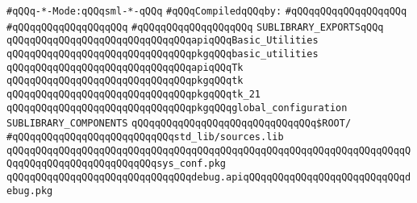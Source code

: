 \label{src/lib/tk/src/tk.sublib}
\verb|#qQQq-*-Mode:qQQqsml-*-qQQq|\newline
\newline
\verb|#qQQqCompiledqQQqby:|\newline
\verb|#qQQqqQQqqQQqqQQqqQQq|\newline
\verb|#qQQqqQQqqQQqqQQqqQQq|\newline
\verb|#qQQqqQQqqQQqqQQqqQQq|\newline
\newline
\verb|SUBLIBRARY_EXPORTSqQQq|\newline
\newline
\newline
\verb|qQQqqQQqqQQqqQQqqQQqqQQqqQQqqQQqapiqQQqBasic_Utilities|\newline
\verb|qQQqqQQqqQQqqQQqqQQqqQQqqQQqqQQqpkgqQQqbasic_utilities|\newline
\newline
\verb|qQQqqQQqqQQqqQQqqQQqqQQqqQQqqQQqapiqQQqTk|\newline
\verb|qQQqqQQqqQQqqQQqqQQqqQQqqQQqqQQqpkgqQQqtk|\newline
\verb|qQQqqQQqqQQqqQQqqQQqqQQqqQQqqQQqpkgqQQqtk_21|\newline
\newline
\verb|qQQqqQQqqQQqqQQqqQQqqQQqqQQqqQQqpkgqQQqglobal_configuration|\newline
\newline
\newline
\newline
\verb|SUBLIBRARY_COMPONENTS|\newline
\newline
\verb|qQQqqQQqqQQqqQQqqQQqqQQqqQQqqQQq$ROOT/|\newline
\newline
\verb|#qQQqqQQqqQQqqQQqqQQqqQQqqQQqstd_lib/sources.lib|\newline
\newline
\verb|qQQqqQQqqQQqqQQqqQQqqQQqqQQqqQQqqQQqqQQqqQQqqQQqqQQqqQQqqQQqqQQqqQQqqQQqqQQqqQQqqQQqqQQqqQQqqQQqsys_conf.pkg|\newline
\verb|qQQqqQQqqQQqqQQqqQQqqQQqqQQqqQQqdebug.apiqQQqqQQqqQQqqQQqqQQqqQQqqQQqdebug.pkg|\newline
